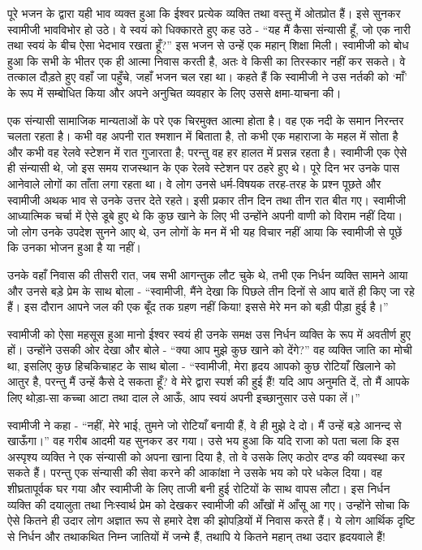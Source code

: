पूरे भजन के द्वारा यही भाव व्यक्त हुआ कि ईश्वर प्रत्येक व्यक्ति तथा वस्तु में ओतप्रोत हैं। इसे सुनकर स्वामीजी भावविभोर हो उठे। वे स्वयं को धिक्कारते हुए कह उठे - “यह मैं कैसा संन्यासी हूँ, जो एक नारी तथा स्वयं के बीच ऐसा भेदभाव रखता हूँ?” इस भजन से उन्हें एक महान् शिक्षा मिली। स्वामीजी को बोध हुआ कि सभी के भीतर एक ही आत्मा निवास करती है, अतः वे किसी का तिरस्कार नहीं कर सकते। वे तत्काल दौड़ते हुए वहाँ जा पहुँचे, जहाँ भजन चल रहा था। कहते हैं कि स्वामीजी ने उस नर्तकी को ‘माँ’ के रूप में सम्बोधित किया और अपने अनुचित व्यवहार के लिए उससे क्षमा-याचना की। 

\delimiter

एक संन्यासी सामाजिक मान्यताओं के परे एक चिरमुक्त आत्मा होता है। वह एक नदी के समान निरन्तर चलता रहता है। कभी वह अपनी रात श्मशान में बिताता है, तो कभी एक महाराजा के महल में सोता है और कभी वह रेलवे स्टेशन में रात गुजारता है; परन्तु वह हर हालत में प्रसन्न रहता है। स्वामीजी एक ऐसे ही संन्यासी थे, जो इस समय राजस्थान के एक रेलवे स्टेशन पर ठहरे हुए थे। पूरे दिन भर उनके पास आनेवाले लोगों का ताँता लगा रहता था। वे लोग उनसे धर्म-विषयक तरह-तरह के प्रश्न पूछते और स्वामीजी अथक भाव से उनके उत्तर देते रहते। इसी प्रकार तीन दिन तथा तीन रात बीत गए। स्वामीजी आध्यात्मिक चर्चा में ऐसे डूबे हुए थे कि कुछ खाने के लिए भी उन्होंने अपनी वाणी को विराम नहीं दिया। जो लोग उनके उपदेश सुनने आए थे, उन लोगों के मन में भी यह विचार नहीं आया कि स्वामीजी से पूछें कि उनका भोजन हुआ है या नहीं। 

उनके वहाँ निवास की तीसरी रात, जब सभी आगन्तुक लौट चुके थे, तभी एक निर्धन व्यक्ति सामने आया और उनसे बड़े प्रेम के साथ बोला - “स्वामीजी, मैंने देखा कि पिछले तीन दिनों से आप बातें ही किए जा रहे हैं। इस दौरान आपने जल की एक बूँद तक ग्रहण नहीं किया! इससे मेरे मन को बड़ी पीड़ा हुई है।” 

स्वामीजी को ऐसा महसूस हुआ मानो ईश्वर स्वयं ही उनके समक्ष उस निर्धन व्यक्ति के रूप में अवतीर्ण हुए हों। उन्होंने उसकी ओर देखा और बोले - “क्या आप मुझे कुछ खाने को देंगे?” वह व्यक्ति जाति का मोची था, इसलिए कुछ हिचकिचाहट के साथ बोला - “स्वामीजी, मेरा हृदय आपको कुछ रोटियाँ खिलाने को आतुर है, परन्तु मैं उन्हें कैसे दे सकता हूँ? वे मेरे द्वारा स्पर्श की हुई हैं! यदि आप अनुमति दें, तो मैं आपके लिए थोड़ा-सा कच्चा आटा तथा दाल ले आऊँ, आप स्वयं अपनी इच्छानुसार उसे पका लें।” 

स्वामीजी ने कहा - “नहीं, मेरे भाई, तुमने जो रोटियाँ बनायी हैं, वे ही मुझे दे दो। मैं उन्हें बड़े आनन्द से खाऊँगा।” वह गरीब आदमी यह सुनकर डर गया। उसे भय हुआ कि यदि राजा को पता चला कि इस अस्पृश्य व्यक्ति ने एक संन्यासी को अपना खाना दिया है, तो वे उसके लिए कठोर दण्ड की व्यवस्था कर सकते हैं। परन्तु एक संन्यासी की सेवा करने की आकांक्षा ने उसके भय को परे धकेल दिया। वह शीघ्रतापूर्वक घर गया और स्वामीजी के लिए ताजी बनी हुई रोटियों के साथ वापस लौटा। इस निर्धन व्यक्ति की दयालुता तथा निःस्वार्थ प्रेम को देखकर स्वामीजी की आँखों में आँसू आ गए। उन्होंने सोचा कि ऐसे कितने ही उदार लोग अज्ञात रूप से हमारे देश की झोपड़ियों में निवास करते हैं। ये लोग आर्थिक दृष्टि से निर्धन और तथाकथित निम्न जातियों में जन्मे हैं, तथापि ये कितने महान् तथा उदार हृदयवाले हैं! 

